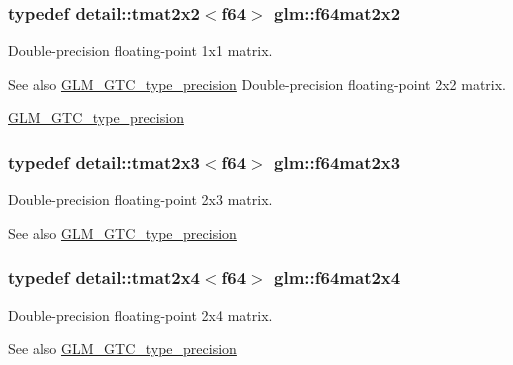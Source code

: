 \subsubsection[{f64mat2x2}]{\setlength{\rightskip}{0pt plus 5cm}typedef detail\+::tmat2x2$<$f64$>$ {\bf glm\+::f64mat2x2}}\label{group__gtc__type__precision_ga5d1ccf7df0dedda7f0c0dd791abf3fd0}
Double-\/precision floating-\/point 1x1 matrix. \begin{DoxySeeAlso}{See also}
\hyperlink{group__gtc__type__precision}{G\+L\+M\+\_\+\+G\+T\+C\+\_\+type\+\_\+precision} Double-\/precision floating-\/point 2x2 matrix. 

\hyperlink{group__gtc__type__precision}{G\+L\+M\+\_\+\+G\+T\+C\+\_\+type\+\_\+precision} 
\end{DoxySeeAlso}
\hypertarget{group__gtc__type__precision_gac2bd82a88b290054fc10cfdba4a62863}{}
\subsubsection[{f64mat2x3}]{\setlength{\rightskip}{0pt plus 5cm}typedef detail\+::tmat2x3$<$f64$>$ {\bf glm\+::f64mat2x3}}\label{group__gtc__type__precision_gac2bd82a88b290054fc10cfdba4a62863}
Double-\/precision floating-\/point 2x3 matrix. \begin{DoxySeeAlso}{See also}
\hyperlink{group__gtc__type__precision}{G\+L\+M\+\_\+\+G\+T\+C\+\_\+type\+\_\+precision} 
\end{DoxySeeAlso}
\hypertarget{group__gtc__type__precision_ga33d98da07dc45f5bdd5f1cbb93ad4934}{}
\subsubsection[{f64mat2x4}]{\setlength{\rightskip}{0pt plus 5cm}typedef detail\+::tmat2x4$<$f64$>$ {\bf glm\+::f64mat2x4}}\label{group__gtc__type__precision_ga33d98da07dc45f5bdd5f1cbb93ad4934}
Double-\/precision floating-\/point 2x4 matrix. \begin{DoxySeeAlso}{See also}
\hyperlink{group__gtc__type__precision}{G\+L\+M\+\_\+\+G\+T\+C\+\_\+type\+\_\+precision} 
\end{DoxySeeAlso}
\hypertarget{group__gtc__type__precision_ga1a05ac0a6e87b279e77d877968f391bc}{}
